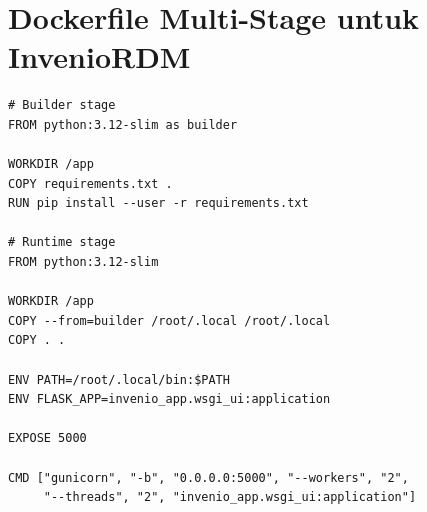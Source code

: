\section{Dockerfile Multi-Stage untuk InvenioRDM}

\begin{lstlisting}[language=docker, caption={Dockerfile}]
# Builder stage
FROM python:3.12-slim as builder

WORKDIR /app
COPY requirements.txt .
RUN pip install --user -r requirements.txt

# Runtime stage
FROM python:3.12-slim

WORKDIR /app
COPY --from=builder /root/.local /root/.local
COPY . .

ENV PATH=/root/.local/bin:$PATH
ENV FLASK_APP=invenio_app.wsgi_ui:application

EXPOSE 5000

CMD ["gunicorn", "-b", "0.0.0.0:5000", "--workers", "2",
     "--threads", "2", "invenio_app.wsgi_ui:application"]
\end{lstlisting}
